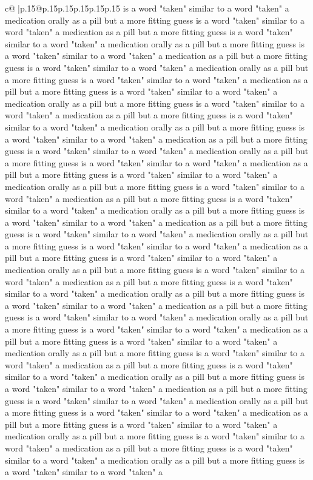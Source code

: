 \documentclass{article}
\begin{document}
{\begin{supertabular}{c@{$\;$}|p{.15\linewidth}@{}p{.15\linewidth}p{.15\linewidth}p{.15\linewidth}p{.15\linewidth}p{.15\linewidth}}
{{{is a word "taken" similar to a word "taken" a medication orally as a pill but a more fitting guess is a word "taken" similar to a word "taken" a medication as a pill but a more fitting guess is a word "taken" similar to a word "taken" a medication orally as a pill but a more fitting guess is a word "taken" similar to a word "taken" a medication as a pill but a more fitting guess is a word "taken" similar to a word "taken" a medication orally as a pill but a more fitting guess is a word "taken" similar to a word "taken" a medication as a pill but a more fitting guess is a word "taken" similar to a word "taken" a medication orally as a pill but a more fitting guess is a word "taken" similar to a word "taken" a medication as a pill but a more fitting guess is a word "taken" similar to a word "taken" a medication orally as a pill but a more fitting guess is a word "taken" similar to a word "taken" a medication as a pill but a more fitting guess is a word "taken" similar to a word "taken" a medication orally as a pill but a more fitting guess is a word "taken" similar to a word "taken" a medication as a pill but a more fitting guess is a word "taken" similar to a word "taken" a medication orally as a pill but a more fitting guess is a word "taken" similar to a word "taken" a medication as a pill but a more fitting guess is a word "taken" similar to a word "taken" a medication orally as a pill but a more fitting guess is a word "taken" similar to a word "taken" a medication as a pill but a more fitting guess is a word "taken" similar to a word "taken" a medication orally as a pill but a more fitting guess is a word "taken" similar to a word "taken" a medication as a pill but a more fitting guess is a word "taken" similar to a word "taken" a medication orally as a pill but a more fitting guess is a word "taken" similar to a word "taken" a medication as a pill but a more fitting guess is a word "taken" similar to a word "taken" a medication orally as a pill but a more fitting guess is a word "taken" similar to a word "taken" a medication as a pill but a more fitting guess is a word "taken" similar to a word "taken" a medication orally as a pill but a more fitting guess is a word "taken" similar to a word "taken" a medication as a pill but a more fitting guess is a word "taken" similar to a word "taken" a medication orally as a pill but a more fitting guess is a word "taken" similar to a word "taken" a medication as a pill but a more fitting guess is a word "taken" similar to a word "taken" a medication orally as a pill but a more fitting guess is a word "taken" similar to a word "taken" a medication as a pill but a more fitting guess is a word "taken" similar to a word "taken" a medication orally as a pill but a more fitting guess is a word "taken" similar to a word "taken" a medication as a pill but a more fitting guess is a word "taken" similar to a word "taken" a medication orally as a pill but a more fitting guess is a word "taken" similar to a word "taken" a medication as a pill but a more fitting guess is a word "taken" similar to a word "taken" a medication orally as a pill but a more fitting guess is a word "taken" similar to a word "taken" a }}}
\end{supertabular}}
\end{document}
